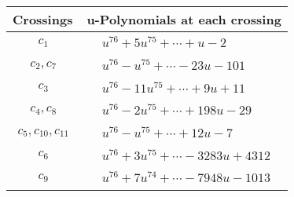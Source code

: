 \documentclass[1p]{elsarticle_modified}
\theoremstyle{definition}
\begin{document}
\begin{tabular}{m{50pt}|m{274pt}}
Crossings & \hspace{64pt}u-Polynomials at each crossing \\
\hline $$\begin{aligned}c_{1}\end{aligned}$$&$\begin{aligned}
&u^{76}+5 u^{75}+\cdots+u-2
\end{aligned}$\\
\hline $$\begin{aligned}c_{2},c_{7}\end{aligned}$$&$\begin{aligned}
&u^{76}- u^{75}+\cdots-23 u-101
\end{aligned}$\\
\hline $$\begin{aligned}c_{3}\end{aligned}$$&$\begin{aligned}
&u^{76}-11 u^{75}+\cdots+9 u+11
\end{aligned}$\\
\hline $$\begin{aligned}c_{4},c_{8}\end{aligned}$$&$\begin{aligned}
&u^{76}-2 u^{75}+\cdots+198 u-29
\end{aligned}$\\
\hline $$\begin{aligned}c_{5},c_{10},c_{11}\end{aligned}$$&$\begin{aligned}
&u^{76}- u^{75}+\cdots+12 u-7
\end{aligned}$\\
\hline $$\begin{aligned}c_{6}\end{aligned}$$&$\begin{aligned}
&u^{76}+3 u^{75}+\cdots-3283 u+4312
\end{aligned}$\\
\hline $$\begin{aligned}c_{9}\end{aligned}$$&$\begin{aligned}
&u^{76}+7 u^{74}+\cdots-7948 u-1013
\end{aligned}$\\
\hline
\end{tabular}\\~\\
\newpage\renewcommand{\arraystretch}{1}
\end{document}
